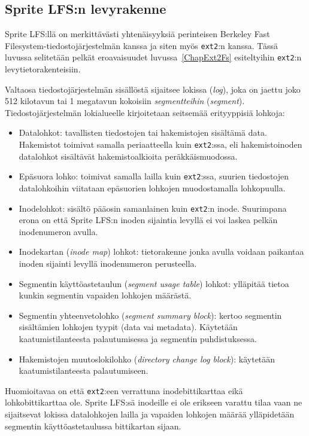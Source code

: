 \subsection{Sprite LFS:n levyrakenne}

Sprite LFS:llä on merkittävästi yhtenäisyyksiä perinteisen Berkeley Fast Filesystem-tiedostojärjestelmän kanssa ja siten myös \texttt{ext2}:n kanssa.
Tässä luvussa selitetään pelkät eroavaisuudet luvussa~\ref{ChapExt2Fs} esiteltyihin \texttt{ext2}:n levytietorakenteisiin.

Valtaosa tiedostojärjestelmän sisällöstä sijaitsee lokissa (\emph{log}), joka on jaettu joko 512 kilotavun tai 1 megatavun kokoisiin \emph{segmentteihin} (\emph{segment}).
Tiedostojärjestelmän lokialueelle kirjoitetaan seitsemää erityyppisiä lohkoja:

\begin{itemize}
    \item{Datalohkot: tavallisten tiedostojen tai hakemistojen sisältämä data.
        Hakemistot toimivat samalla periaatteella kuin \texttt{ext2}:ssa, eli hakemistoinoden datalohkot sisältävät hakemistoalkioita peräkkäismuodossa.}
    \item{Epäsuora lohko: toimivat samalla lailla kuin \texttt{ext2}:ssa, suurien tiedostojen datalohkoihin viitataan epäsuorien lohkojen muodostamalla lohkopuulla.}
    \item{Inodelohkot: sisältö pääosin samanlainen kuin \texttt{ext2}:n inode. Suurimpana erona on että Sprite LFS:n inoden sijaintia levyllä ei voi laskea pelkän inodenumeron avulla.}
    \item{Inodekartan (\emph{inode map}) lohkot: tietorakenne jonka avulla voidaan paikantaa inoden sijainti levyllä inodenumeron perusteella.}
    \item{Segmentin käyttöastetaulun (\emph{segment usage table}) lohkot: ylläpitää tietoa kunkin segmentin vapaiden lohkojen määrästä.}
    \item{Segmentin yhteenvetolohko (\emph{segment summary block}): kertoo segmentin sisältämien lohkojen tyypit (data vai metadata). Käytetään kaatumistilanteesta palautumisessa ja segmentin puhdistuksessa.}
    \item{Hakemistojen muutoslokilohko (\emph{directory change log block}): käytetään kaatumistilanteesta palautumiseen.}
\end{itemize}
Huomioitavaa on että \texttt{ext2}:een verrattuna inodebittikarttaa eikä lohkobittikarttaa ole.
Sprite LFS:sä inodeille ei ole erikseen varattu tilaa vaan ne sijaitsevat lokissa datalohkojen lailla
ja vapaiden lohkojen määrää ylläpidetään segmentin käyttöastetaulussa bittikartan sijaan.

